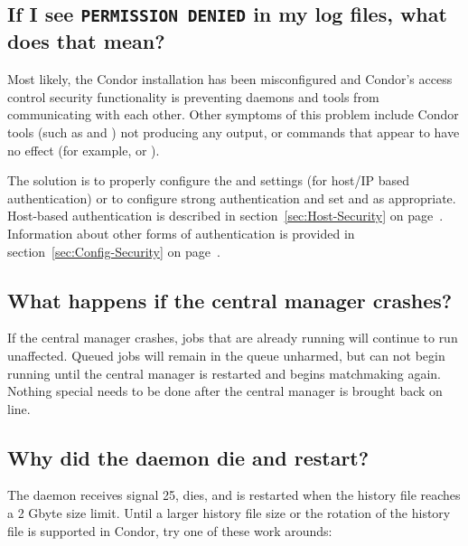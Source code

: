 \subsection*{If I see \texttt{PERMISSION DENIED} in my log files,
what does that mean?}

Most likely, the Condor installation has been misconfigured
and Condor's access control security functionality is preventing
daemons and tools from communicating with each other.
Other symptoms of this problem include Condor tools (such as
 and ) not producing any output, or commands
that appear to have no effect (for example,  or
). 

The solution is to properly configure the  and
 settings (for host/IP based authentication) or to
configure strong authentication and set  and
 as appropriate.
Host-based authentication is described in
section~\ref{sec:Host-Security} on page~\pageref{sec:Host-Security}.
Information about other forms of authentication is provided in 
section~\ref{sec:Config-Security} on page~\pageref{sec:Config-Security}.

\subsection*{What happens if the central manager crashes?}

If the central manager crashes, jobs that are already running will
continue to run unaffected.
Queued jobs will remain in the queue unharmed, but can not begin
running until the central manager is restarted and begins matchmaking
again.
Nothing special needs to be done after the central manager is brought
back on line.

\subsection*{Why did the  daemon die and restart?}

The  daemon receives signal 25,
dies, and is restarted when the
history file reaches a 2 Gbyte size limit.
Until a larger history file size or the rotation of the history
file is supported in Condor,
try one of these work arounds:

